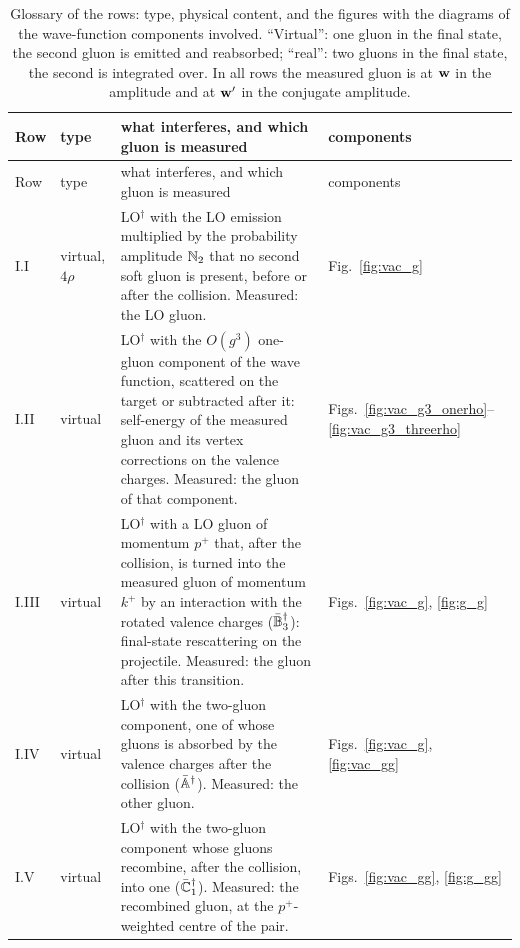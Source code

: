 \begingroup
\footnotesize
\renewcommand{\arraystretch}{1.25}
\begin{longtable}{@{}l>{\raggedright\arraybackslash}p{}>{\raggedright\arraybackslash}p{}>{\raggedright\arraybackslash}p{}@{}}
\caption{Glossary of the rows: type, physical content, and the figures with the diagrams of the wave-function components involved. ``Virtual'': one gluon in the final state, the second gluon is emitted and reabsorbed; ``real'': two gluons in the final state, the second is integrated over. In all rows the measured gluon is at $\mathbf{w}$ in the amplitude and at $\mathbf{w}'$ in the conjugate amplitude.}\label{tab:glossary}\\
\toprule
Row & type & what interferes, and which gluon is measured & components\\
\midrule
\endfirsthead
\toprule
Row & type & what interferes, and which gluon is measured & components\\
\midrule
\endhead
\bottomrule
\endfoot
I.I & virtual, $4\rho$ & LO$^\dagger$ with the LO emission multiplied by the probability amplitude $\mathbb{N}_2$ that no second soft gluon is present, before or after the collision. Measured: the LO gluon. & Fig.~\ref{fig:vac_g}\\
I.II & virtual & LO$^\dagger$ with the $O(g^3)$ one-gluon component of the wave function, scattered on the target or subtracted after it: self-energy of the measured gluon and its vertex corrections on the valence charges. Measured: the gluon of that component. & Figs.~\ref{fig:vac_g3_onerho}--\ref{fig:vac_g3_threerho}\\
I.III & virtual & LO$^\dagger$ with a LO gluon of momentum $p^+$ that, after the collision, is turned into the measured gluon of momentum $k^+$ by an interaction with the rotated valence charges ($\bar{\mathbb{B}}_3^\dagger$): final-state rescattering on the projectile. Measured: the gluon after this transition. & Figs.~\ref{fig:vac_g}, \ref{fig:g_g}\\
I.IV & virtual & LO$^\dagger$ with the two-gluon component, one of whose gluons is absorbed by the valence charges after the collision ($\bar{\mathbb{A}}^\dagger$). Measured: the other gluon. & Figs.~\ref{fig:vac_g}, \ref{fig:vac_gg}\\
I.V & virtual & LO$^\dagger$ with the two-gluon component whose gluons recombine, after the collision, into one ($\bar{\mathbb{C}}_1^\dagger$). Measured: the recombined gluon, at the $p^+$-weighted centre of the pair. & Figs.~\ref{fig:vac_gg}, \ref{fig:g_gg}\\

\end{longtable}
